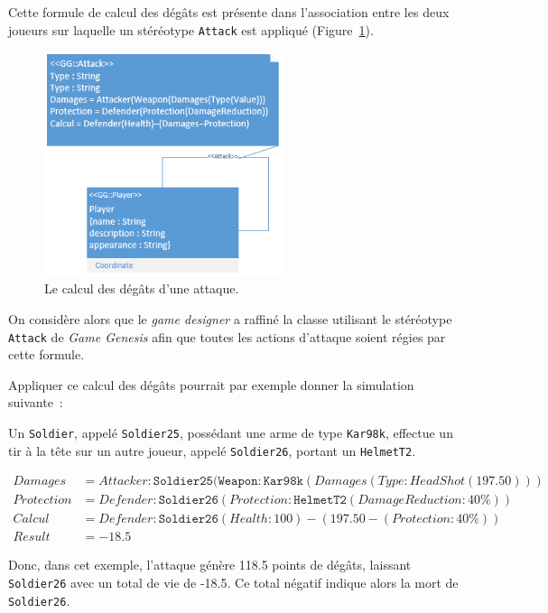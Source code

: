 Cette formule de calcul des dégâts est présente dans l'association entre les deux joueurs sur laquelle un stéréotype \texttt{Attack} est appliqué (Figure~\ref{fig.PUBG_attack_degats}).

\begin{figure}
    \centering
    \includegraphics[width=7cm]{10_img/chap6/p_attack_p.PNG}
    \caption{Le calcul des dégâts d'une attaque.}
    \label{fig.PUBG_attack_degats}
\end{figure}

On considère alors que le \emph{game designer} a raffin\'e la classe utilisant le stéréotype \texttt{Attack} de \emph{Game Genesis} afin que toutes les actions d'attaque soient régies par cette formule.



Appliquer ce calcul des dégâts pourrait par exemple donner la simulation suivante~: 
{\footnotesize
\begin{framed}
Un \texttt{Soldier}, appelé \texttt{Soldier25}, possédant une arme de type \texttt{Kar98k}, effectue un tir à la tête sur un autre joueur, appelé \texttt{Soldier26}, portant un \texttt{HelmetT2}.


\begin{equation*}
\begin{split}
Damages& = Attacker:\texttt{Soldier25}(\texttt{Weapon}:\texttt{Kar98k}(Damages(Type:HeadShot(197.50)))\\
Protection& = Defender:\texttt{Soldier26}(Protection:\texttt{HelmetT2}(DamageReduction:40\%))\\
Calcul& = Defender:\texttt{Soldier26}(Health:100) - (197.50 - (Protection:40\%))\\
Result& = -18.5
\end{split}
\end{equation*}


Donc, dans cet exemple, l'attaque génère 118.5 points de dégâts, laissant \texttt{Soldier26} avec un total de vie de -18.5. Ce total négatif indique alors la mort de \texttt{Soldier26}.
\end{framed}
}

